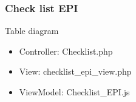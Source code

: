 \documentclass[letterpaper,10pt,english,openany,oneside]{sphinxmanual}
\begin{document}
\subsubsection{Check list EPI}
\label{\detokenize{module/module:check-list-epi}}
\sphinxAtStartPar
Table diagram

\begin{sphinxVerbatim}[commandchars=\\\{\}]
      
                                              
    
                                              
      
\end{sphinxVerbatim}
\begin{itemize}
\item {} 
\sphinxAtStartPar
Controller: Checklist.php

\item {} 
\sphinxAtStartPar
View: checklist\_epi\_view.php

\item {} 
\sphinxAtStartPar
ViewModel: Checklist\_EPI.js

\end{itemize}
\end{document}
